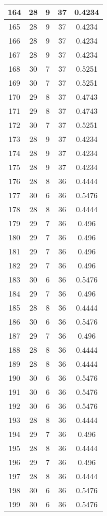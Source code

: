 \documentclass[letterpaper, 12pt]{article}
\begin{document}
\begin{longtable}{|c|c|c|c|c|}
\hline
164 & 28 & 9 & 37 & 0.4234 \\
\hline
165 & 28 & 9 & 37 & 0.4234 \\
\hline
166 & 28 & 9 & 37 & 0.4234 \\
\hline
167 & 28 & 9 & 37 & 0.4234 \\
\hline
168 & 30 & 7 & 37 & 0.5251 \\
\hline
169 & 30 & 7 & 37 & 0.5251 \\
\hline
170 & 29 & 8 & 37 & 0.4743 \\
\hline
171 & 29 & 8 & 37 & 0.4743 \\
\hline
172 & 30 & 7 & 37 & 0.5251 \\
\hline
173 & 28 & 9 & 37 & 0.4234 \\
\hline
174 & 28 & 9 & 37 & 0.4234 \\
\hline
175 & 28 & 9 & 37 & 0.4234 \\
\hline
176 & 28 & 8 & 36 & 0.4444 \\
\hline
177 & 30 & 6 & 36 & 0.5476 \\
\hline
178 & 28 & 8 & 36 & 0.4444 \\
\hline
179 & 29 & 7 & 36 & 0.496 \\
\hline
180 & 29 & 7 & 36 & 0.496 \\
\hline
181 & 29 & 7 & 36 & 0.496 \\
\hline
182 & 29 & 7 & 36 & 0.496 \\
\hline
183 & 30 & 6 & 36 & 0.5476 \\
\hline
184 & 29 & 7 & 36 & 0.496 \\
\hline
185 & 28 & 8 & 36 & 0.4444 \\
\hline
186 & 30 & 6 & 36 & 0.5476 \\
\hline
187 & 29 & 7 & 36 & 0.496 \\
\hline
188 & 28 & 8 & 36 & 0.4444 \\
\hline
189 & 28 & 8 & 36 & 0.4444 \\
\hline
190 & 30 & 6 & 36 & 0.5476 \\
\hline
191 & 30 & 6 & 36 & 0.5476 \\
\hline
192 & 30 & 6 & 36 & 0.5476 \\
\hline
193 & 28 & 8 & 36 & 0.4444 \\
\hline
194 & 29 & 7 & 36 & 0.496 \\
\hline
195 & 28 & 8 & 36 & 0.4444 \\
\hline
196 & 29 & 7 & 36 & 0.496 \\
\hline
197 & 28 & 8 & 36 & 0.4444 \\
\hline
198 & 30 & 6 & 36 & 0.5476 \\
\hline
199 & 30 & 6 & 36 & 0.5476 \\
\hline
\end{longtable}
\end{document}
